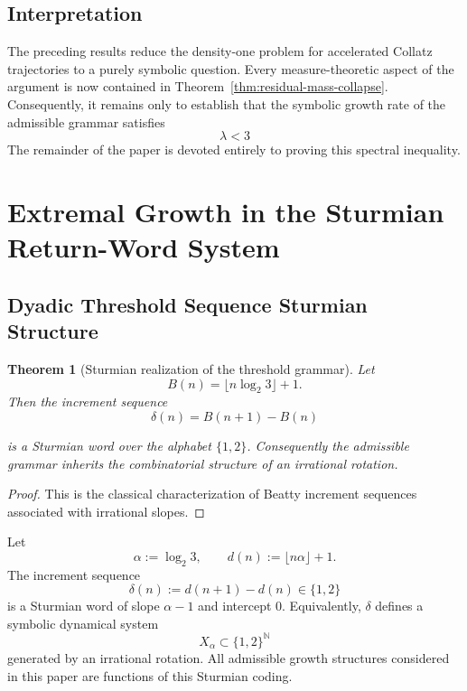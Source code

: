 \documentclass[12pt, oneside]{article}
\numberwithin{equation}{section}
\theoremstyle{definition}
\theoremstyle{plain}
\newtheorem{theorem}{Theorem}[section]
\theoremstyle{remark}
\begin{document}
\subsection{Interpretation}

The preceding results reduce the density-one problem for accelerated Collatz
trajectories to a purely symbolic question. Every measure-theoretic aspect of
the argument is now contained in Theorem~\ref{thm:residual-mass-collapse}.
Consequently, it remains only to establish that the symbolic growth rate of
the admissible grammar satisfies
\[
\lambda < 3
\]
The remainder of the paper is devoted entirely to proving this spectral inequality.

\section{Extremal Growth in the Sturmian Return-Word System}
\label{sec:extremal-growth}

\subsection{Dyadic Threshold Sequence Sturmian Structure}

\begin{theorem}[Sturmian realization of the threshold grammar]
Let
\[
B(n)=\lfloor n\log_2 3\rfloor+1.
\]
Then the increment sequence
\[
\delta(n)=B(n+1)-B(n)
\]

is a Sturmian word over the alphabet \(\{1,2\}\).
Consequently the admissible grammar inherits the combinatorial
structure of an irrational rotation.
\end{theorem}

\begin{proof}
This is the classical characterization of Beatty increment sequences
associated with irrational slopes.
\end{proof}

Let
\[
\alpha := \log_2 3,
\qquad
d(n) := \lfloor n\alpha \rfloor + 1.
\]
The increment sequence
\[
\delta(n) := d(n+1) - d(n) \in \{1,2\}
\]
is a Sturmian word of slope $\alpha - 1$ and intercept $0$.
Equivalently, $\delta$ defines a symbolic dynamical system
\[
X_\alpha \subset \{1,2\}^{\mathbb{N}}
\]
generated by an irrational rotation. All admissible growth structures
considered in this paper are functions of this Sturmian coding.
\end{document}
